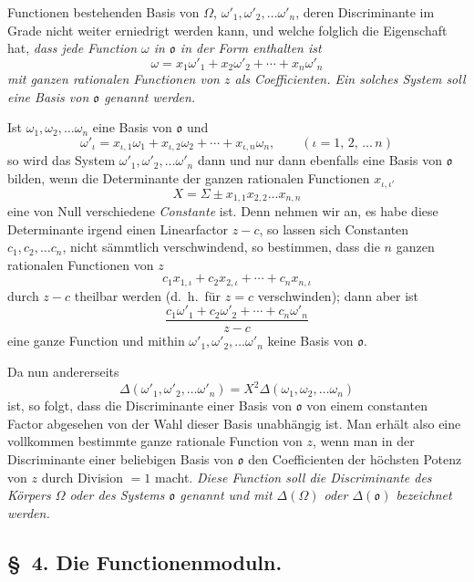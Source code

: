 \documentclass{article}
\begin{document}
Functionen bestehenden Basis von $\Omega$, $\omega'_{1}, \omega'_{2}, \ldots \omega'_{n}$, deren Discriminante im Grade nicht weiter erniedrigt werden kann, und welche folglich die Eigenschaft hat, \emph{dass jede Function $\omega$ in $\mathfrak{o}$ in der Form enthalten ist}
\[ \omega = x_{1}\omega'_{1} + x_{2}\omega'_{2} + \cdots + x_{n}\omega'_{n} \]
\emph{mit ganzen rationalen Functionen von $z$ als Coefficienten. Ein solches System soll eine Basis von $\mathfrak{o}$ genannt werden.}

Ist $\omega_{1}, \omega_{2}, \ldots \omega_{n}$ eine Basis von $\mathfrak{o}$ und
\[ \omega'_{\iota} = x_{\iota,1}\omega_{1} + x_{\iota,2}\omega_{2} + \cdots + x_{\iota,n}\omega_{n}, \qquad {\scriptstyle (\iota = 1,\, 2,\, \ldots\, n)} \]
so wird das System $\omega'_{1}, \omega'_{2}, \ldots \omega'_{n}$ dann und nur dann ebenfalls eine Basis von $\mathfrak{o}$ bilden, wenn die Determinante der ganzen rationalen Functionen $x_{\iota,\iota'}$
\[ X = \Sigma \pm x_{1,1}x_{2,2}\ldots x_{n,n} \]
eine von Null verschiedene \emph{Constante} ist. Denn nehmen wir an, es habe diese Determinante irgend einen Linearfactor $z-c$, so lassen sich Constanten $c_{1}, c_{2}, \ldots c_{n}$, nicht sämmtlich verschwindend, so bestimmen, dass die $n$ ganzen rationalen Functionen von $z$
\[ c_{1}x_{1,\iota} + c_{2}x_{2,\iota} + \cdots + c_{n}x_{n,\iota} \]
durch $z-c$ theilbar werden (d.\ h.\ für $z = c$ verschwinden); dann aber ist
\[ \frac{c_{1}\omega'_{1} + c_{2}\omega'_{2} + \cdots + c_{n}\omega'_{n}}{z-c} \]
eine ganze Function und mithin $\omega'_{1}, \omega'_{2}, \ldots \omega'_{n}$ keine Basis von $\mathfrak{o}$.

Da nun andererseits
\[ \Delta(\omega'_{1}, \omega'_{2}, \ldots \omega'_{n}) = X^{2}\Delta(\omega_{1}, \omega_{2}, \ldots \omega_{n}) \]
ist, so folgt, dass die Discriminante einer Basis von $\mathfrak{o}$ von einem constanten Factor abgesehen von der Wahl dieser Basis unabhängig ist. Man erhält also eine vollkommen bestimmte ganze rationale Function von $z$, wenn man in der Discriminante einer beliebigen Basis von $\mathfrak{o}$ den Coefficienten der höchsten Potenz von $z$ durch Division $= 1$ macht. \emph{Diese Function soll die Discriminante des Körpers $\Omega$ oder des Systems $\mathfrak{o}$ genannt und mit $\Delta(\Omega)$ oder $\Delta(\mathfrak{o})$ bezeichnet werden.}

\subsection*{§~4. Die Functionenmoduln.}
\end{document}

